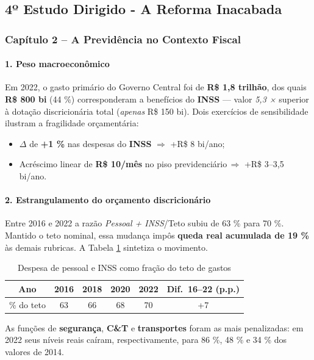 \documentclass[a4paper,12pt]{article}[abntex2]
\begin{document}
\newpage
\subsection{\textbf{4º Estudo Dirigido - A Reforma Inacabada }}

\subsubsection{\textbf{Capítulo 2 – A Previdência no Contexto Fiscal}}

\paragraph{1. Peso macroeconômico}  
Em 2022, o gasto primário do Governo Central foi de \textbf{R\$ 1,8 trilhão}, dos quais \textbf{R\$ 800 bi} (44 \%) corresponderam a benefícios do \textbf{INSS} — valor \emph{5,3 ×} superior à dotação discricionária total (\emph{apenas} R\$ 150 bi). Dois exercícios de sensibilidade ilustram a fragilidade orçamentária:

\begin{itemize}
  \item $\Delta$ de \textbf{+1 \%} nas despesas do \textbf{INSS} $\Rightarrow$ +R\$ 8 bi/ano;  
  \item Acréscimo linear de \textbf{R\$ 10/mês} no piso previdenciário\,$\Rightarrow$ +R\$ 3–3,5 bi/ano.
\end{itemize}

\paragraph{2. Estrangulamento do orçamento discricionário}  
Entre 2016 e 2022 a razão \emph{Pessoal + INSS}/Teto subiu de 63 \% para 70 \%. Mantido o teto nominal, essa mudança impôs \textbf{queda real acumulada de 19 \%} às demais rubricas. A Tabela \ref{tab:teto} sintetiza o movimento.

\begin{table}[h]
\centering
\caption{Despesa de pessoal e INSS como fração do teto de gastos}
\label{tab:teto}
\begin{tabular}{c|ccccc}
\toprule
Ano & 2016 & 2018 & 2020 & 2022 & Dif.\ 16–22 (p.p.)\\
\midrule
\% do teto & 63 & 66 & 68 & 70 & +7 \\
\bottomrule
\end{tabular}
\end{table}

As funções de \textbf{segurança}, \textbf{C\&T} e \textbf{transportes} foram as mais penalizadas: em 2022 seus níveis reais caíram, respectivamente, para 86 \%, 48 \% e 34 \% dos valores de 2014.
\end{document}
